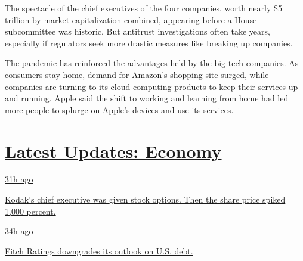 The spectacle of the chief executives of the four companies, worth
nearly \$5 trillion by market capitalization combined, appearing before
a House subcommittee was historic. But antitrust investigations often
take years, especially if regulators seek more drastic measures like
breaking up companies.

The pandemic has reinforced the advantages held by the big tech
companies. As consumers stay home, demand for Amazon's shopping site
surged, while companies are turning to its cloud computing products to
keep their services up and running. Apple said the shift to working and
learning from home had led more people to splurge on Apple's devices and
use its services.

\hypertarget{latest-updates-economy}{%
\section{\texorpdfstring{\href{https://www.nytimes3xbfgragh.onion/live/2020/07/31/business/stock-market-today-coronavirus?action=click\&pgtype=Article\&state=default\&region=MAIN_CONTENT_1\&context=storylines_live_updates}{Latest
Updates:
Economy}}{Latest Updates: Economy}}\label{latest-updates-economy}}

\href{https://www.nytimes3xbfgragh.onion/live/2020/07/31/business/stock-market-today-coronavirus?action=click\&pgtype=Article\&state=default\&region=MAIN_CONTENT_1\&context=storylines_live_updates\#kodaks-chief-executive-was-given-stock-options-then-the-share-price-spiked-1000-percent}{31h
ago}

\href{https://www.nytimes3xbfgragh.onion/live/2020/07/31/business/stock-market-today-coronavirus?action=click\&pgtype=Article\&state=default\&region=MAIN_CONTENT_1\&context=storylines_live_updates\#kodaks-chief-executive-was-given-stock-options-then-the-share-price-spiked-1000-percent}{Kodak's
chief executive was given stock options. Then the share price spiked
1,000 percent.}

\href{https://www.nytimes3xbfgragh.onion/live/2020/07/31/business/stock-market-today-coronavirus?action=click\&pgtype=Article\&state=default\&region=MAIN_CONTENT_1\&context=storylines_live_updates\#fitch-ratings-downgrades-its-outlook-on-us-debt}{34h
ago}

\href{https://www.nytimes3xbfgragh.onion/live/2020/07/31/business/stock-market-today-coronavirus?action=click\&pgtype=Article\&state=default\&region=MAIN_CONTENT_1\&context=storylines_live_updates\#fitch-ratings-downgrades-its-outlook-on-us-debt}{Fitch
Ratings downgrades its outlook on U.S. debt.}

